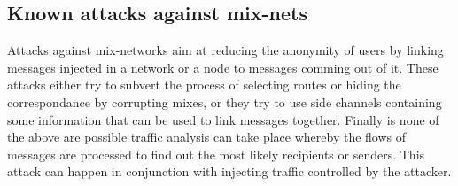 \documentclass[11pt]{IEEEtran}
\begin{document}
\subsection{Known attacks against mix-nets}

Attacks against mix-networks aim at reducing the anonymity of users by
linking messages injected in a network or a node to messages comming
out of it. These attacks either try to subvert the process of
selecting routes or hiding the correspondance by corrupting mixes, or
they try to use side channels containing some information that can be
used to link messages together. Finally is none of the above are
possible traffic analysis can take place whereby the flows of messages
are processed to find out the most likely recipients or senders. This
attack can happen in conjunction with injecting traffic controlled by
the attacker.
\end{document}
